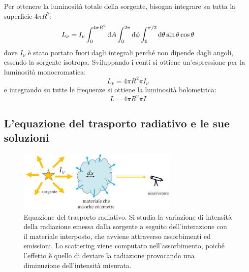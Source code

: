Per ottenere la luminosità totale della sorgente, bisogna integrare su tutta la superficie $4\pi R^2$:
\[
    L_\nu = I_\nu \int_0^{4\pi R^2} \mathop{\mathrm{{}d}}\mathopen{} A \int_0^{2\pi} \mathop{\mathrm{{}d}}\mathopen{} \phi \int_0^{\pi/2} \mathop{\mathrm{{}d}}\mathopen{} \theta \sin{\theta} \cos{\theta}
\]
dove $I_\nu$ è stato portato fuori dagli integrali perché non dipende dagli angoli, essendo la sorgente isotropa. Sviluppando i conti si ottiene un'espressione per la luminosità monocromatica:
\begin{equation}\label{eq:luminosità-monocromatica-intensità}
    L_\nu = 4 \pi R^2 \pi I_\nu
\end{equation}
e integrando su tutte le frequenze si ottiene la luminosità bolometrica:
\begin{equation}\label{eq:luminosità-intensità}
    L = 4 \pi R^2 \pi I
\end{equation}

\subsection{L'equazione del trasporto radiativo e le sue soluzioni}\label{sec:trasporto-radiativo}\label{sec:soluzioni-trasporto-radiativo}

\begin{figure}
\centering
\includegraphics[width=0.7\textwidth]{immagini/trasporto-radiativo.jpg}
\caption{Equazione del trasporto radiativo. Si studia la variazione di intensità della radiazione emessa dalla sorgente a seguito dell'interazione con il materiale interposto, che avviene attraverso assorbimenti ed emissioni. Lo scattering viene computato nell'assorbimento, poiché l'effetto è quello di deviare la radiazione provocando una diminuzione dell'intensità misurata.}
\label{fig:trasporto-radiativo}
\end{figure}

